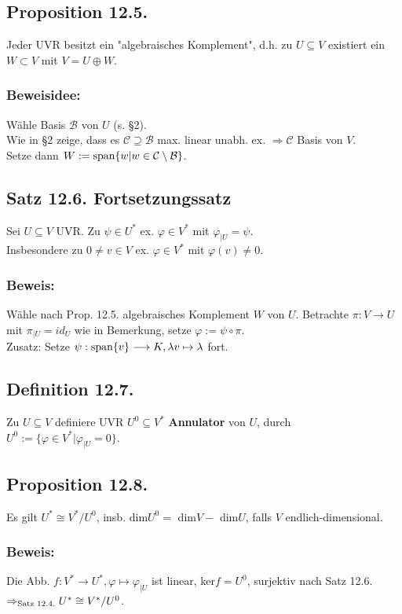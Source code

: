 \documentclass[a4paper, 12pt]{extarticle}
\newcommand{\tn}[1]{\textnormal {#1}}
\begin{document}
\subsection*{Proposition 12.5.}
Jeder UVR besitzt ein "algebraisches Komplement", d.h. zu $U \subseteq V$ existiert ein $W\subset V$ mit $V = U\oplus W$.
\subsubsection*{Beweisidee:}
Wähle Basis $\mathcal{B}$ von $U$ (s. §2).\\
Wie in §2 zeige, dass es $\mathcal{C} \supseteq \mathcal{B}$ max. linear unabh. ex. $\Rightarrow \mathcal{C}$ Basis von $V$.\\
Setze dann $W := \tn{span}\{w | w\in \mathcal{C}\setminus\mathcal{B}\}$.
\subsection*{Satz 12.6. Fortsetzungssatz}
Sei $U \subseteq V$ UVR. Zu $\psi \in U^*$ ex. $\varphi \in V^*$ mit $\varphi_{|U} = \psi$.\\
Insbesondere zu $0 \neq v \in V$ ex. $\varphi \in V^*$ mit $\varphi(v) \neq 0$.\\
\subsubsection*{Beweis:}
Wähle nach Prop. 12.5. algebraisches Komplement $W$ von $U$. Betrachte $\pi:V \longrightarrow U$ mit $\pi_{|U}=id_U$ wie in Bemerkung, setze $\varphi := \psi \circ \pi$.\\
Zusatz: Setze $\psi: \tn{span}\{v\}\longrightarrow K, \lambda v \mapsto \lambda$ fort.
\subsection*{Definition 12.7.}
Zu $U \subseteq V$ definiere UVR $U^0 \subseteq V^*$ \textbf{Annulator} von $U$, durch $U^0 := \{\varphi\in V^* | \varphi_{|U} = 0\}$.
\subsection*{Proposition 12.8.}
Es gilt $U^* \cong V^*/U^0$, insb. dim$U^0 = $ dim$V -$ dim$U$, falls $V$ endlich-dimensional.
\subsubsection*{Beweis:}
Die Abb. $f: V^*\longrightarrow U^*, \varphi\mapsto\varphi_{|U}$ ist linear, ker$f = U^0$, surjektiv nach Satz 12.6. $\Rightarrow_{\tn{Satz 12.4.}} U^*\cong V^*/U^0$.
\end{document}
